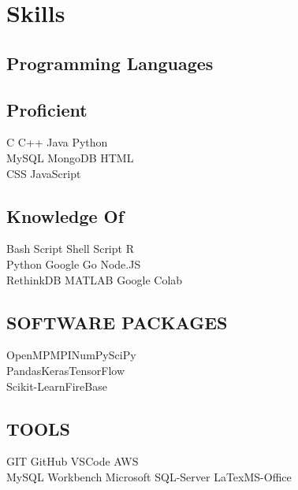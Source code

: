 \documentclass[]{imman_resume}
\begin{document}
\begin{minipage}[t]{0.33\textwidth}
\section{Skills}
\subsection{Programming Languages}
\sectionsep
\subsection{Proficient}
\sectionsep
C \textbullet{} C++ \textbullet{} Java \textbullet{} Python\\
MySQL \textbullet{} MongoDB \textbullet{} HTML \\
CSS \textbullet{} JavaScript\\ 

\sectionsep

\subsection{Knowledge Of}
\sectionsep
Bash Script \textbullet{} Shell Script \textbullet{} R\\
Python \textbullet{} Google Go \textbullet{} Node.JS\\
RethinkDB \textbullet{} MATLAB \textbullet{}Google Colab  \\ 
\sectionsep

\subsection{SOFTWARE PACKAGES}
\sectionsep
OpenMP\textbullet{}MPI\textbullet{}NumPy\textbullet{}SciPy\\
Pandas\textbullet{}Keras\textbullet{}TensorFlow\\
Scikit-Learn\textbullet{}FireBase

\sectionsep
\subsection{TOOLS}
\sectionsep
GIT\textbullet{} GitHub\textbullet{} VSCode \textbullet{}AWS \\
MySQL Workbench\textbullet{} Microsoft SQL-Server\textbullet{}
LaTex\textbullet{}MS-Office\\
\sectionsep


\end{minipage} 
\hfill
\end{document}
